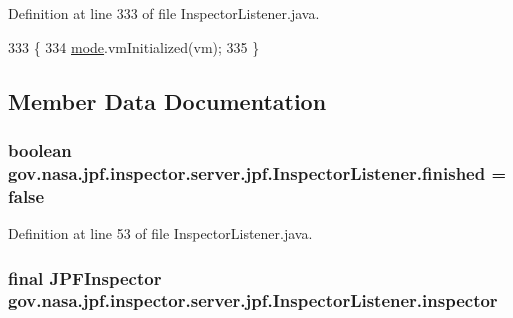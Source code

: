 Definition at line 333 of file Inspector\+Listener.\+java.


\begin{DoxyCode}
333                                    \{
334     \hyperlink{classgov_1_1nasa_1_1jpf_1_1inspector_1_1server_1_1jpf_1_1_inspector_listener_a666ea4f9fb4e868903700b0a0523a992}{mode}.vmInitialized(vm);
335   \}
\end{DoxyCode}


\subsection{Member Data Documentation}
\subsubsection[{\texorpdfstring{finished}{finished}}]{\setlength{\rightskip}{0pt plus 5cm}boolean gov.\+nasa.\+jpf.\+inspector.\+server.\+jpf.\+Inspector\+Listener.\+finished = false\hspace{0.3cm}{\ttfamily [private]}}\hypertarget{classgov_1_1nasa_1_1jpf_1_1inspector_1_1server_1_1jpf_1_1_inspector_listener_acfc69bebb12dc44e0227f0eda89e9be2}{}\label{classgov_1_1nasa_1_1jpf_1_1inspector_1_1server_1_1jpf_1_1_inspector_listener_acfc69bebb12dc44e0227f0eda89e9be2}


Definition at line 53 of file Inspector\+Listener.\+java.

\subsubsection[{\texorpdfstring{inspector}{inspector}}]{\setlength{\rightskip}{0pt plus 5cm}final {\bf J\+P\+F\+Inspector} gov.\+nasa.\+jpf.\+inspector.\+server.\+jpf.\+Inspector\+Listener.\+inspector\hspace{0.3cm}{\ttfamily [private]}}\hypertarget{classgov_1_1nasa_1_1jpf_1_1inspector_1_1server_1_1jpf_1_1_inspector_listener_aa9eefde45ad4c9704c87520e1dc2c29b}{}\label{classgov_1_1nasa_1_1jpf_1_1inspector_1_1server_1_1jpf_1_1_inspector_listener_aa9eefde45ad4c9704c87520e1dc2c29b}


